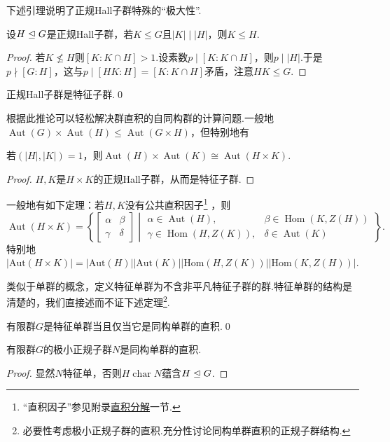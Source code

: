 下述引理说明了正规Hall子群特殊的“极大性”.
\begin{lemma*}
	设$H\trianglelefteq G$是正规Hall子群，若$K\le G$且$|K|\mid|H|$，则$K\le H$.
\end{lemma*}
\begin{proof}
	若$K\nleq H$则$[K:K\cap H]>1$.设素数$p\mid[K:K\cap H]$，则$p\mid|H|$.于是$p\nmid[G:H]$，这与$p\mid[HK:H]=[K:K\cap H]$矛盾，注意$HK\le G$.
\end{proof}
\begin{cor*}
	正规Hall子群是特征子群.\qed
\end{cor*}

根据此推论可以轻松解决群直积的自同构群的计算问题.一般地$\operatorname*{Aut}(G)\times\operatorname*{Aut}(H)\le\operatorname*{Aut}(G\times H)$，但特别地有
\begin{prop}
	若$(|H|,|K|)=1$，则$\operatorname*{Aut}(H)\times\operatorname*{Aut}(K)\cong\operatorname*{Aut}(H\times K)$.
\end{prop}
\begin{proof}
	$H,K$是$H\times K$的正规Hall子群，从而是特征子群.
\end{proof}
\begin{remark}
	一般地有如下定理：若$H,K$没有公共直积因子\footnote{“直积因子”参见附录\hyperlink{subsec:DirectDecomposition}{直积分解}一节.} ，则
	\[
		\operatorname*{Aut}(H\times K)=\left\{\begin{bmatrix}
			\alpha&\beta\\
			\gamma&\delta
		\end{bmatrix}\middle| \begin{array}{ll}
			\alpha\in\operatorname*{Aut}(H),&\beta\in\operatorname*{Hom}(K,Z(H))\\
			\gamma\in\operatorname*{Hom}(H,Z(K)),&\delta\in\operatorname*{Aut}(K)
		\end{array}\right\}.
	\]
	特别地$|\mathrm{Aut}(H\times K)|=|\mathrm{Aut}(H)||\mathrm{Aut}(K)||\mathrm{Hom}(H,Z(K))||\mathrm{Hom}(K,Z(H))|$.
\end{remark}

类似于单群的概念，定义{\heiti 特征单群}为不含非平凡特征子群的群.特征单群的结构是清楚的，我们直接述而不证下述定理\footnote{必要性考虑极小正规子群的直积.充分性讨论同构单群直积的正规子群结构.}.
\begin{thm}
	有限群$G$是特征单群当且仅当它是同构单群的直积.\qed
\end{thm}
\begin{cor*}
	有限群$G$的极小正规子群$N$是同构单群的直积.
\end{cor*}
\begin{proof}
	显然$N$特征单，否则$H\operatorname*{char}N$蕴含$H\trianglelefteq G$.
\end{proof}

